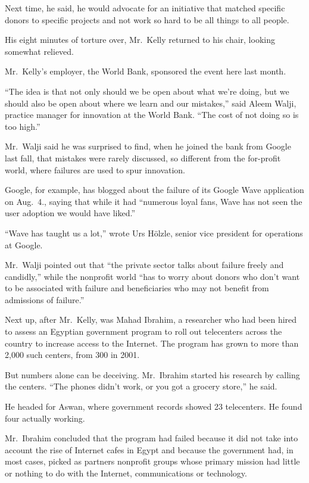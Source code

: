 ﻿\documentclass[12pt]{article}
\begin{document}
Next time, he said, he would advocate for an initiative that matched specific donors to specific
projects and not work so hard to be all things to all people.

His eight minutes of torture over, Mr.~Kelly returned to his chair, looking somewhat relieved.

Mr.~Kelly's employer, the World Bank, sponsored the event here last month.

``The idea is that not only should we be open about what we're doing, but we should also be open
about where we learn and our mistakes,'' said Aleem Walji, practice manager for innovation at the
World Bank. ``The cost of not doing so is too high.''

Mr.~Walji said he was surprised to find, when he joined the bank from Google last fall, that
mistakes were rarely discussed, so different from the for-profit world, where failures are used to
spur innovation.

Google, for example, has blogged about the failure of its Google Wave application on Aug.~4., saying
that while it had ``numerous loyal fans, Wave has not seen the user adoption we would have liked.''

``Wave has taught us a lot,'' wrote Urs Hölzle, senior vice president for operations at Google.

Mr.~Walji pointed out that ``the private sector talks about failure freely and candidly,'' while the
nonprofit world ``has to worry about donors who don't want to be associated with failure and
beneficiaries who may not benefit from admissions of failure.''

Next up, after Mr.~Kelly, was Mahad Ibrahim, a researcher who had been hired to assess an Egyptian
government program to roll out telecenters across the country to increase access to the Internet.
The program has grown to more than 2,000 such centers, from 300 in 2001.

But numbers alone can be deceiving. Mr.~Ibrahim started his research by calling the centers. ``The
phones didn't work, or you got a grocery store,'' he said.

He headed for Aswan, where government records showed 23 telecenters. He found four actually working.

Mr.~Ibrahim concluded that the program had failed because it did not take into account the rise of
Internet cafes in Egypt and because the government had, in most cases, picked as partners nonprofit
groups whose primary mission had little or nothing to do with the Internet, communications or
technology.
\end{document}
